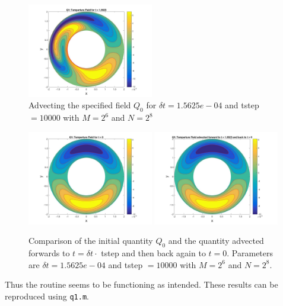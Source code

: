 \documentclass{article}
\begin{document}
\begin{figure}[h!]
		\includegraphics[width = 0.49\textwidth]{fig_q1Advect10Final}
		\caption{Advecting the specified field $Q_0$ for $\delta t = 1.5625e-04$ and tstep $= 10000$ with $M = 2^6$ and $N=2^8$}
		\label{fig:q1Advect}
	\end{figure}
	
	\begin{figure}[h!]
		\centering
		\includegraphics[width = 0.49\textwidth]{fig_q1_Q0}
		\includegraphics[width = 0.49\textwidth]{fig_q1AdvectBack}
		\caption{Comparison of the initial quantity $Q_0$ and the quantity advected forwards to $t = \delta t \cdot $ tstep and then back again to $t=0$. Parameters are $\delta t = 1.5625e-04$ and tstep $= 10000$ with $M = 2^6$ and $N=2^8$.}
		\label{fig:q1Compare}
	\end{figure}

 Thus the routine seems to be functioning as intended. These results can be reproduced using \texttt{q1.m}.
 
\end{document}
